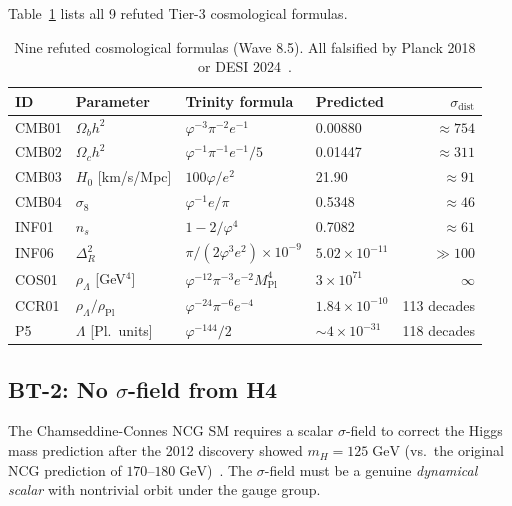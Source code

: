 \documentclass[12pt,a4paper]{article}
\newcommand{\BT}[1]{\textbf{BT-#1}}
\newcommand{\sigdist}{\sigma_{\mathrm{dist}}}
\begin{document}
Table~\ref{tab:cosmo_refuted} lists all 9 refuted Tier-3 cosmological formulas.

\begin{table}[htbp]
  \centering
  \caption{Nine refuted cosmological formulas (Wave 8.5). All falsified by Planck 2018
    \cite{Planck:2018vyg} or DESI 2024~\cite{DESI:2024mwx}.}
  \label{tab:cosmo_refuted}
  \begin{tabular}{llllr}
    \toprule
    ID & Parameter & Trinity formula & Predicted & \(\sigdist\) \\
    \midrule
    CMB01 & \(\Omega_b h^2\) & \(\varphi^{-3}\pi^{-2}e^{-1}\) & 0.00880 & \(\approx 754\) \\
    CMB02 & \(\Omega_c h^2\) & \(\varphi^{-1}\pi^{-1}e^{-1}/5\) & 0.01447 & \(\approx 311\) \\
    CMB03 & \(H_0\) [km/s/Mpc] & \(100\varphi/e^2\) & 21.90 & \(\approx 91\) \\
    CMB04 & \(\sigma_8\) & \(\varphi^{-1}e/\pi\) & 0.5348 & \(\approx 46\) \\
    INF01 & \(n_s\) & \(1 - 2/\varphi^4\) & 0.7082 & \(\approx 61\) \\
    INF06 & \(\Delta_R^2\) & \(\pi/(2\varphi^3 e^2)\times 10^{-9}\) & \(5.02\times10^{-11}\) & \(\gg 100\) \\
    COS01 & \(\rho_\Lambda\) [GeV\(^4\)] & \(\varphi^{-12}\pi^{-3}e^{-2}M_{\mathrm{Pl}}^4\) & \(3\times10^{71}\) & \(\infty\) \\
    CCR01 & \(\rho_\Lambda/\rho_{\mathrm{Pl}}\) & \(\varphi^{-24}\pi^{-6}e^{-4}\) & \(1.84\times10^{-10}\) & 113 decades \\
    P5   & \(\Lambda\) [Pl.\ units] & \(\varphi^{-144}/2\) & \(\sim 4\times10^{-31}\) & 118 decades \\
    \bottomrule
  \end{tabular}
\end{table}

\subsection{\BT{2}: No \(\sigma\)-field from H4}
\label{sec:bt2}

The Chamseddine-Connes NCG SM requires a scalar \(\sigma\)-field to correct the Higgs mass
prediction after the 2012 discovery showed \(m_H = 125\;\mathrm{GeV}\) (vs.\ the original
NCG prediction of \(170\)--\(180\;\mathrm{GeV}\))~\cite{Chamseddine:2012qs}. The \(\sigma\)-field
must be a genuine \emph{dynamical scalar} with nontrivial orbit under the gauge group.
\end{document}
